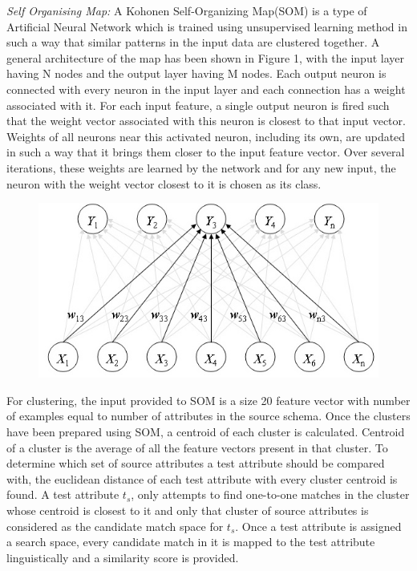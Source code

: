 \documentclass[conference]{IEEEtran}
\begin{document}
\textit{Self Organising Map: }A Kohonen Self-Organizing Map(SOM) is a type of Artificial Neural Network which is trained using unsupervised learning method in such a way that similar patterns in the input data are clustered together. A general architecture of the map has been shown in Figure 1, with the input layer having N nodes and the output layer having M nodes. Each output neuron is connected with every neuron in the input layer and each connection has a weight associated with it. For each input feature, a single output neuron is fired such that the weight vector associated with this neuron is closest to that input vector. Weights of all neurons near this activated neuron, including its own, are updated in such a way that it brings them closer to the input feature vector. Over several iterations, these weights are learned by the network and for any new input, the neuron with the weight vector closest to it is chosen as its class.

\begin{figure}[h]
\centering
\includegraphics[scale=0.4]{1.jpeg}
\end{figure}

For clustering, the input provided to SOM is a size 20 feature vector with number of examples equal to number of attributes in the source schema. Once the clusters have been prepared using SOM, a centroid of each cluster is calculated. Centroid of a cluster is the average of all the feature vectors present in that cluster. To determine which set of source attributes a test attribute should be compared with, the euclidean distance of each test attribute with every cluster centroid is found. A test attribute $t_s$, only attempts to find one-to-one matches in the cluster whose centroid is closest to it and only that cluster of source attributes is considered as the candidate match space for $t_s$. Once a test attribute is assigned a search space, every candidate match in it is mapped to the test attribute linguistically and a similarity score is provided. 
\end{document}
